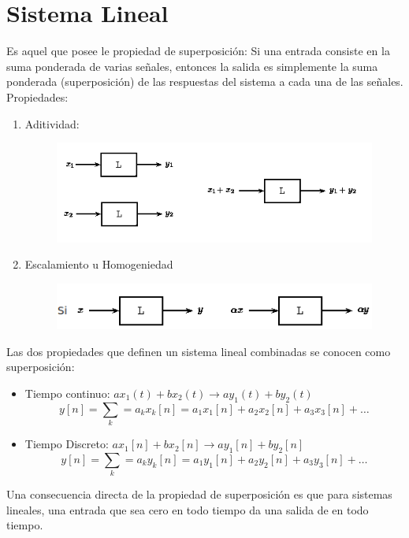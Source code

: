 \documentclass{article}
\author{Jorge Gómez Reus}
\date{}
\begin{document}
\maketitle
\tableofcontents
\section{Sistema Lineal}
Es aquel que posee le propiedad de superposición: Si una entrada consiste en la suma ponderada de varias señales, entonces la salida es simplemente la suma ponderada (superposición) de las respuestas del sistema a cada una de las señales.\\
Propiedades: 
\begin{enumerate}
	\item Aditividad:\\
	\begin{figure}[h!]
		\centering
		\includegraphics[scale=.8]{img/aditivity}
	\end{figure} 
	\item Escalamiento u Homogeniedad
	\begin{figure}[h!]
		\centering
		\includegraphics[scale=.8]{img/proportionality}
	\end{figure} 
\end{enumerate}
Las dos propiedades que definen un sistema lineal combinadas se conocen como superposición:
\begin{itemize}
	\item Tiempo continuo: $ax_1(t) + bx_2(t) \rightarrow ay_1(t) + by_2(t)$\\
	$$y[n] = \sum_{k}=a_{k}x_{k}[n] = a_1x_1[n] + a_2x_2[n] + a_3x_3[n] + \ldots$$
	\item Tiempo Discreto: $ax_1[n] + bx_2[n] \rightarrow ay_1[n] + by_2[n]$\\
	$$y[n] = \sum_{k}=a_{k}y_{k}[n] = a_1y_1[n] + a_2y_2[n] + a_3y_3[n] + \ldots$$
\end{itemize}
Una consecuencia directa de la propiedad de superposición es que para sistemas lineales, una entrada que sea cero en todo tiempo da una salida de en todo tiempo.
\end{document}
